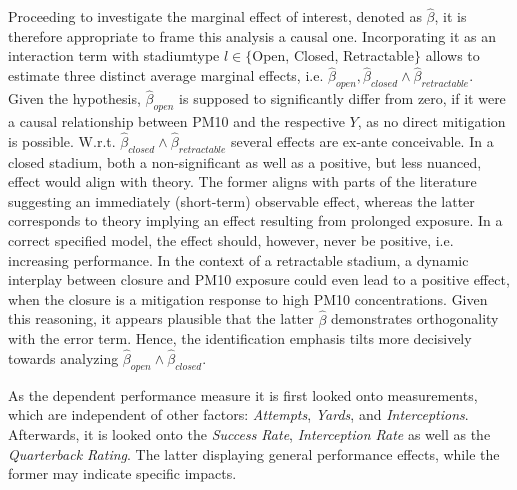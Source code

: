 \documentclass[12pt,a4paper]{article}
\begin{document}
{Proceeding to investigate the marginal effect of interest, denoted as $\hat{\beta}$, it is therefore appropriate to frame this analysis a causal one. Incorporating it as an interaction term with stadiumtype $l \in \{$Open, Closed, Retractable$\}$ allows to estimate three distinct average marginal effects, i.e. $\hat{\beta}_{open},\hat{\beta}_{closed} \wedge \hat{\beta}_{retractable}$. Given the hypothesis, $\hat{\beta}_{open}$ is supposed to significantly differ from zero, if it were a causal relationship between PM10 and the respective $Y$, as no direct mitigation is possible. W.r.t. $\hat{\beta}_{closed} \wedge \hat{\beta}_{retractable}$ several effects are ex-ante conceivable. In a closed stadium, both a non-significant as well as a positive, but less nuanced, effect would align with theory. The former aligns with parts of the literature suggesting an immediately (short-term) observable effect, whereas the latter corresponds to theory implying an effect resulting from prolonged exposure. In a correct specified model, the effect should, however, never be positive, i.e. increasing performance. In the context of a retractable stadium, a dynamic interplay between closure and PM10 exposure could even lead to a positive effect, when the closure is a mitigation response to high PM10 concentrations. Given this reasoning, it appears plausible that the latter $\hat{\beta}$ demonstrates orthogonality with the error term. Hence, the identification emphasis tilts more decisively towards analyzing $\hat{\beta}_{open} \wedge \hat{\beta}_{closed}$.

As the dependent performance measure it is first looked onto measurements, which are independent of other factors: \textit{Attempts}, \textit{Yards}, and \textit{Interceptions}. Afterwards, it is looked onto the \textit{Success Rate}, \textit{Interception Rate} as well as the \textit{Quarterback Rating}. The latter displaying general performance effects, while the former may indicate specific impacts.

}
\end{document}
